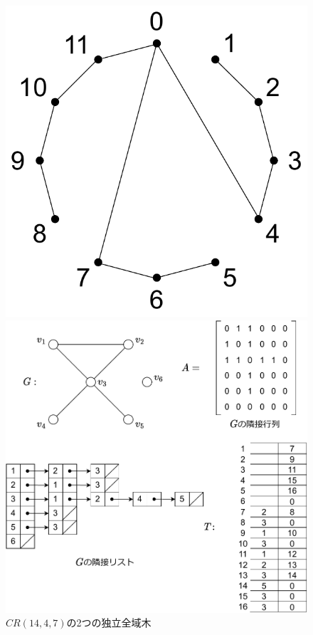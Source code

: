 \documentclass[twocolumn, 11pt]{jsarticle}
\begin{document}
        \begin{figure}[H]
            \centering
            \begin{minipage}{0.45\linewidth}
                \centering
                \includegraphics[width=\linewidth]{figures/IST1.pdf}
            \end{minipage}
            \begin{minipage}{0.45\linewidth}
                \centering
                \includegraphics[width=\linewidth]{figures/graphs-ad.pdf}
            \end{minipage}
            \caption{$CR(14,4,7)$の2つの独立全域木}
            \label{fig:IST}
        \end{figure}
\end{document}
